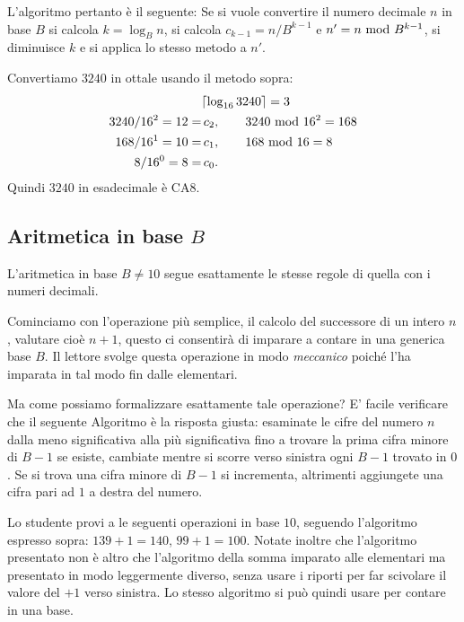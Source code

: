 L'algoritmo pertanto è il seguente: Se si vuole convertire il numero decimale $n$ in base $B$ si calcola $k = \log_B n$, si calcola $c_{k-1} = n / B^{k-1}$ e $n' = n \ \text{mod}\ B^{k-1}$, si diminuisce $k$ e si applica lo stesso metodo a $n'$. 

\begin{ex}
Convertiamo $3240$ in ottale usando il metodo sopra:
\begin{align*}
  &\lceil \log_{16} 3240 \rceil = 3\\
  3240 / 16^2 = 12 = &\, c_2, \qquad 3240 \ \text{mod}\ 16^2 = 168\\
  168 / 16^1 = 10 = &\, c_1,  \qquad 168 \ \text{mod}\ 16 = 8\\
  8 / 16^0 = 8 = &\, c_0.  
\end{align*}
Quindi $3240$ in esadecimale è $\mathrm{CA}8$.
\end{ex}

\subsection{Aritmetica in base \protect$B$}

L'aritmetica in base $B\neq 10$ segue esattamente le stesse regole di quella con i numeri decimali. 

Cominciamo con l'operazione più semplice, il calcolo del successore di un intero $n$, valutare cioè $n+1$, questo ci consentirà di imparare a contare in una generica base $B$. Il lettore svolge questa operazione in modo \emph{meccanico} poiché l'ha imparata in tal modo fin dalle elementari. 

Ma come possiamo formalizzare esattamente tale operazione? E' facile verificare che il seguente Algoritmo è la risposta giusta:
esaminate le cifre del numero $n$ dalla meno significativa alla più
significativa fino a trovare la prima cifra minore di $B-1$ se esiste, cambiate
mentre si scorre verso sinistra ogni $B-1$ trovato in $0$. Se si trova una
cifra minore di $B-1$ si incrementa, altrimenti aggiungete una cifra pari ad
$1$ a destra del numero.

Lo studente provi a le seguenti operazioni in base $10$, seguendo l'algoritmo
espresso sopra: $139+1 = 140$, $99+1 = 100$. Notate inoltre che l'algoritmo presentato non è altro che l'algoritmo della somma imparato alle elementari ma presentato in modo leggermente diverso, senza usare i riporti per far scivolare
il valore del $+1$ verso sinistra. Lo stesso algoritmo si può quindi usare per contare in una base.

